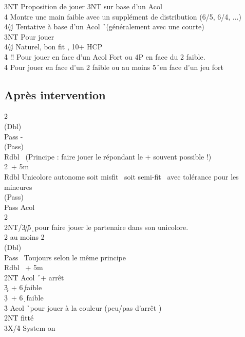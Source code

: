 \documentclass[a4paper]{article}
\begin{document}
\begin{bidtable}
3NT \> Proposition de jouer 3NT sur base d'un Acol \h \\
4\s \> Montre une main faible avec un supplément de distribution (6/5, 6/4, ...)\\
4\c/4\d \> Tentative à base d'un Acol \h\ (généralement avec une courte)\-\\
3NT \> Pour jouer\\
4\c/4\d \> Naturel, bon fit \s , 10+ HCP\\
4\h \> !! Pour jouer en face d'un Acol Fort ou 4P en face du 2 faible.\\
4\s \> Pour jouer en face d'un 2 faible ou au moins 5\h\ en face d'un jeu fort\-
\end{bidtable}

\subsection{Après intervention}

\begin{bidtable}
2\h\+\\
(Dbl)\+\\
Pass - \s \+\\
(Pass)\+\\
Rdbl \s\ (Principe : faire jouer le répondant le + souvent possible !)\\
2\s {}\s\ + 5m\-\-\\
Rdbl \> Unicolore autonome soit misfit \s\ soit semi-fit \s\ avec tolérance pour les mineures\+\\
(Pass)\+\\
Pass \> Acol \h \\
2\s {}\s \\
2NT/3\c {}\c /5\d\ pour faire jouer le partenaire dans son unicolore.\-\-\\
2\s \> au moins 2\s \+\\
(Dbl)\+\\
Pass \s\ Toujours selon le même principe\\
Rdbl \s\ + 5m\\
2NT \> Acol \h\ + arrêt \s \\
3\c {}\s\ + 6\c\ faible\\
3\d {}\s\ + 6\d\ faible\\
3\h \> Acol \h\ pour jouer à la couleur (peu/pas d'arrêt \s )\-\-\\
2NT \> fitté\\
3X/4\h \> System on\-\-
\end{bidtable}
\end{document}
